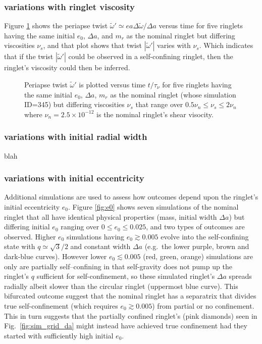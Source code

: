 \documentclass[preprint]{aastex62}
\begin{document}
\subsubsection{variations with ringlet viscosity}
\label{subsec:viscosity-variations}

Figure \ref{fig:wt_prime_vs_time} shows the periapse twist $\tilde{\omega}' \simeq ea\Delta\tilde{\omega}/\Delta a$ 
versus time for five ringlets
having the same initial $e_0$, $\Delta a$, and $m_r$ as the nominal ringlet but differing viscosities $\nu_s$, and
that plot shows that twist $|\tilde{\omega}'|$ varies with $\nu_s$. Which indicates that if 
the twist $|\tilde{\omega}'|$ could be observed in a self-confining ringlet, then 
the ringlet's viscosity could then be inferred. 

\begin{figure}
    \caption{
        \label{fig:wt_prime_vs_time}
        Periapse twist $\tilde{\omega}'$ is plotted versus time $t/\tau_\nu$ for five ringlets
        having the same initial $e_0$, $\Delta a$, $m_r$ as the nominal ringlet (whose simulation ID=345)
        but differing viscosities $\nu_s$ that range over $0.5\nu_n\le\nu_s\le2\nu_n$
        where $\nu_n=2.5\times10^{-12}$ is the nominal ringlet's shear visocity.
    }
\end{figure}


\subsubsection{variations with initial radial width}
\label{subsec:width-variations}

blah

\subsubsection{variations with initial eccentricity}
\label{subsec:e-variations}

Additional simulations are used to assess how outcomes depend upon the ringlet's initial eccentricity $e_0$.
Figure \ref{fig:e0} shows seven simulations of the nominal ringlet that all have identical
physical properties (mass, initial width $\Delta a$) but differing initial $e_0$ ranging
over $0\le e_0\le 0.025$, and two types of outcomes are observed. Higher $e_0$ simulations having $e_0\gtrsim0.005$ 
evolve into the self-confining state with $q\simeq\sqrt{3}/2$ and constant width $\Delta a$
(e.g.\ the lower purple, brown and dark-blue curves). However 
lower $e_0\lesssim0.005$ (red, green, orange) simulations are only 
are partially self--confining in that self-gravity does not pump up the ringlet's $q$
sufficient for self-confinement, so these simulated ringlet's $\Delta a$ spreads radially
albeit slower than the circular ringlet (uppermost blue curve).
This bifurcated outcome suggest that the nominal ringlet has a
separatrix that divides true self-confinement (which requires $e_0\gtrsim0.005$) from partial or no
confinement. This in turn suggests that the partially confined ringlet's (pink diamonds) seen in
Fig.\ \ref{fig:sim_grid_da} might instead have achieved 
true confinement had they started with sufficiently high initial $e_0$.
\end{document}
